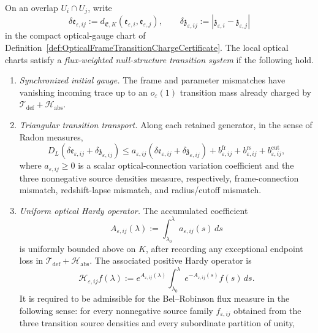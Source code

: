 \begin{definition}\label{def:FluxWeightedNullStructureTransitionSystem}
On an overlap $U_i\cap U_j$, write
\[
    \delta\mathfrak e_{\varepsilon,ij}
    :=
    d_{\mathfrak E,K}(\mathfrak e_{\varepsilon,i},\mathfrak e_{\varepsilon,j}),
    \qquad
    \delta\mathfrak z_{\varepsilon,ij}
    :=
    |\mathfrak z_{\varepsilon,i}-\mathfrak z_{\varepsilon,j}|
\]
in the compact optical-gauge chart of Definition~\ref{def:OpticalFrameTransitionChargeCertificate}.  The local optical charts satisfy a \emph{flux-weighted null-structure transition system} if the following hold.
\begin{enumerate}
    \item \emph{Synchronized initial gauge.} The frame and parameter mismatches have vanishing incoming trace up to an $o_\varepsilon(1)$ transition mass already charged by $\mathcal T_{\mathrm{def}}+\mathcal H_{\mathrm{abs}}$.
    \item \emph{Triangular transition transport.} Along each retained generator, in the sense of Radon measures,
    \[
        D_L(\delta\mathfrak e_{\varepsilon,ij}+\delta\mathfrak z_{\varepsilon,ij})
        \le
        a_{\varepsilon,ij}
        (\delta\mathfrak e_{\varepsilon,ij}+\delta\mathfrak z_{\varepsilon,ij})
        +
        b^{\mathrm{fr}}_{\varepsilon,ij}
        +
        b^{\mathrm{rs}}_{\varepsilon,ij}
        +
        b^{\mathrm{cut}}_{\varepsilon,ij},
    \]
    where $a_{\varepsilon,ij}\ge0$ is a scalar optical-connection variation coefficient and the three nonnegative source densities measure, respectively, frame-connection mismatch, redshift-lapse mismatch, and radius/cutoff mismatch.
    \item \emph{Uniform optical Hardy operator.} The accumulated coefficient
    \[
        A_{\varepsilon,ij}(\lambda)
        :=
        \int_{\lambda_0}^{\lambda}a_{\varepsilon,ij}(s)\,ds
    \]
    is uniformly bounded above on $K$, after recording any exceptional endpoint loss in $\mathcal T_{\mathrm{def}}+\mathcal H_{\mathrm{abs}}$.  The associated positive Hardy operator is
    \[
        \mathcal H_{\varepsilon,ij}f(\lambda)
        :=
        e^{A_{\varepsilon,ij}(\lambda)}
        \int_{\lambda_0}^{\lambda}
        e^{-A_{\varepsilon,ij}(s)}f(s)\,ds .
    \]
    It is required to be admissible for the Bel--Robinson flux measure in the following sense: for every nonnegative source family $f_{\varepsilon,ij}$ obtained from the three transition source densities and every subordinate partition of unity,

\end{enumerate}
\end{definition}
